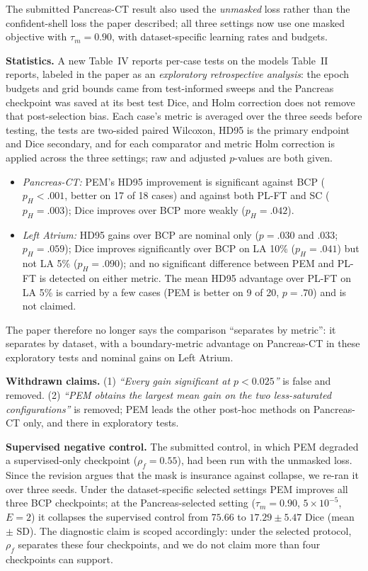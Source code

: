 \documentclass[11pt,a4paper]{article}
\begin{document}
The submitted Pancreas-CT result also used the \emph{unmasked} loss rather than the confident-shell loss the paper described; all three settings now use one masked objective with $\tau_m=0.90$, with dataset-specific learning rates and budgets.

\textbf{Statistics.} A new Table~IV reports per-case tests on the models Table~II reports, labeled in the paper as an \emph{exploratory retrospective analysis}: the epoch budgets and grid bounds came from test-informed sweeps and the Pancreas checkpoint was saved at its best test Dice, and Holm correction does not remove that post-selection bias. Each case's metric is averaged over the three seeds before testing, the tests are two-sided paired Wilcoxon, HD95 is the primary endpoint and Dice secondary, and for each comparator and metric Holm correction is applied across the three settings; raw and adjusted $p$-values are both given.
\begin{itemize}[leftmargin=1.4em,itemsep=0.25em,topsep=0.3em]
\item \emph{Pancreas-CT:} PEM's HD95 improvement is significant against BCP ($p_H<.001$, better on 17 of 18 cases) and against both PL-FT and SC ($p_H=.003$); Dice improves over BCP more weakly ($p_H=.042$).
\item \emph{Left Atrium:} HD95 gains over BCP are nominal only ($p=.030$ and $.033$; $p_H=.059$); Dice improves significantly over BCP on LA 10\% ($p_H=.041$) but not LA 5\% ($p_H=.090$); and no significant difference between PEM and PL-FT is detected on either metric. The mean HD95 advantage over PL-FT on LA 5\% is carried by a few cases (PEM is better on 9 of 20, $p=.70$) and is not claimed.
\end{itemize}
The paper therefore no longer says the comparison ``separates by metric'': it separates by dataset, with a boundary-metric advantage on Pancreas-CT in these exploratory tests and nominal gains on Left Atrium.

\textbf{Withdrawn claims.} (1) \emph{``Every gain significant at $p<0.025$''} is false and removed. (2) \emph{``PEM obtains the largest mean gain on the two less-saturated configurations''} is removed; PEM leads the other post-hoc methods on Pancreas-CT only, and there in exploratory tests.

\textbf{Supervised negative control.} The submitted control, in which PEM degraded a supervised-only checkpoint ($\rho_f=0.55$), had been run with the unmasked loss. Since the revision argues that the mask is insurance against collapse, we re-ran it over three seeds. Under the dataset-specific selected settings PEM improves all three BCP checkpoints; at the Pancreas-selected setting ($\tau_m=0.90$, $5\times10^{-5}$, $E=2$) it collapses the supervised control from $75.66$ to $17.29\pm5.47$ Dice (mean $\pm$ SD). The diagnostic claim is scoped accordingly: under the selected protocol, $\rho_f$ separates these four checkpoints, and we do not claim more than four checkpoints can support.
\end{document}

